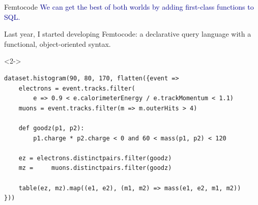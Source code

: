 \documentclass[aspectratio=169]{beamer}
\begin{document}
\begin{frame}[fragile]{Femtocode}
\vspace{0.35 cm}
\textcolor{darkblue}{We can get the best of both worlds by adding first-class functions to SQL.}

\vspace{0.2 cm}
Last year, I started developing Femtocode: a declarative query language with a functional, object-oriented syntax.

\begin{uncoverenv}<2->
\begin{center}
\small
\begin{lstlisting}[language=femtocode]
dataset.histogram(90, 80, 170, flatten({event =>
    electrons = event.tracks.filter(
        e => 0.9 < e.calorimeterEnergy / e.trackMomentum < 1.1)
    muons = event.tracks.filter(m => m.outerHits > 4)

    def goodz(p1, p2):
        p1.charge * p2.charge < 0 and 60 < mass(p1, p2) < 120

    ez = electrons.distinctpairs.filter(goodz)
    mz =     muons.distinctpairs.filter(goodz)

    table(ez, mz).map((e1, e2), (m1, m2) => mass(e1, e2, m1, m2))
}))
\end{lstlisting}
\end{center}
\end{uncoverenv}
\end{frame}
\end{document}
